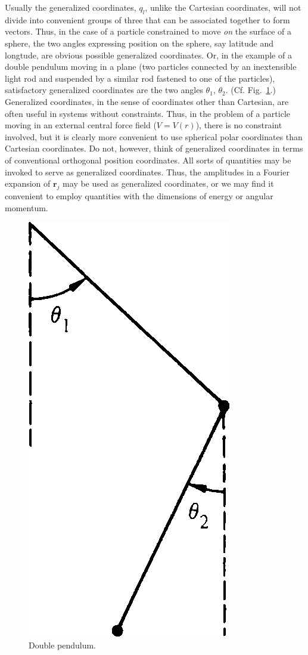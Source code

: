 Usually the generalized coordinates, \(q_l\), unlike the Cartesian coordinates, will not divide into convenient groups of three that can be associated together to form vectors. Thus, in the case of a particle constrained to move \emph{on} the surface of a sphere, the two angles expressing position on the sphere, say latitude and longtude, are obvious possible generalized coordinates. Or, in the example of a double pendulum moving in a plane (two particles connected by an inextensible light rod and suspended by a similar rod fastened to one of the particles), satisfactory generalized coordinates are the two angles \(\theta_1\), \(\theta_2\). (Cf. Fig.~\ref{fig:1.4}.) Generalized coordinates, in the sense of coordinates other than Cartesian, are often useful in systems without constraints. Thus, in the problem of a particle moving in an external central force field (\(V=V\left(r\right)\)), there is no constraint involved, but it is clearly more convenient to use spherical polar coordinates than Cartesian coordinates. Do not, however, think of generalized coordinates in terms of conventional orthogonal position coordinates. All sorts of quantities may be invoked to serve as generalized coordinates. Thus, the amplitudes in a Fourier expansion of \(\symbf{r}_j\) may be used as generalized coordinates, or we may find it convenient to employ quantities with the dimensions of energy or angular momentum.

\begin{figure}[htbp]
    \centering
    \includegraphics[scale = 0.225]{01/figures/1.4}
    \caption{Double pendulum.}
    \label{fig:1.4}
\end{figure}

